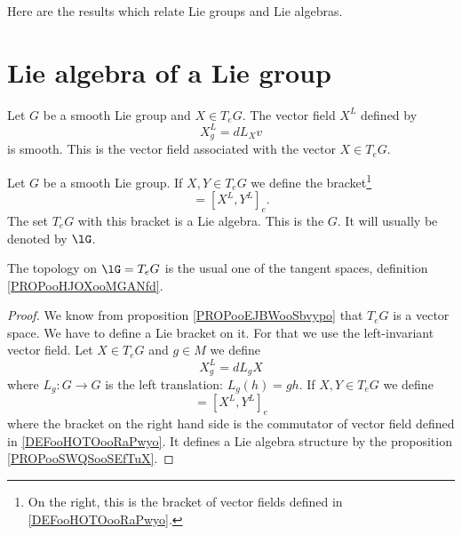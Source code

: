 
Here are the results which relate Lie groups and Lie algebras.

\section{Lie algebra of a Lie group}

\begin{lemmaDef}        \label{DEFooSSDYooOwjHso}
    Let \( G\) be a smooth Lie group and \( X\in T_eG\). The vector field \( X^L\) defined by
    \begin{equation}
        X^L_g=dL_Xv
    \end{equation}
    is smooth. This is the  vector field associated with the vector \( X\in T_eG\).
\end{lemmaDef}

\begin{propositionDef}      \label{DEFooKDCPooZOJsMD}
    Let \( G\) be a smooth Lie group. If \( X,Y\in T_eG\) we define the bracket\footnote{On the right, this is the bracket of vector fields defined in \ref{DEFooHOTOooRaPwyo}.}
    \begin{equation}
        [X,Y] = [X^L,Y^L]_e.
    \end{equation}
    The set \( T_eG\) with this bracket is a Lie algebra. This is the  \( G\). It will usually be denoted by \( \lG\).

    The topology on \( \lG=T_eG\) is the usual one of the tangent spaces, definition \ref{PROPooHJOXooMGANfd}.
\end{propositionDef}

\begin{proof}
    We know from proposition \ref{PROPooEJBWooSbvypo} that \( T_eG\) is a vector space. We have to define a Lie bracket on it. For that we use the left-invariant vector field. Let \( X\in T_eG\) and \( g\in M\) we define
    \begin{equation}
        X^L_g=dL_gX
    \end{equation}
    where \( L_g\colon G\to G\) is the left translation: \( L_g(h)=gh\). If \( X,Y\in T_eG\) we define
    \begin{equation}
        [X,Y]=[X^L,Y^L]_e
    \end{equation}
    where the bracket on the right hand side is the commutator of vector field defined in \ref{DEFooHOTOooRaPwyo}. It defines a Lie algebra structure by the proposition \ref{PROPooSWQSooSEfTuX}.
\end{proof}

